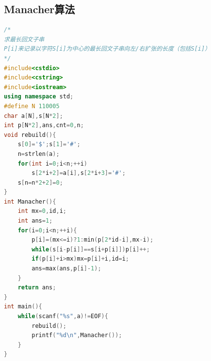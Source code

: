 \documentclass[UTF8,a4paper,titlepage]{ctexart}
\begin{document}
\subsection{Manacher算法}
\begin{lstlisting}[language=C++]
/*
求最长回文子串
P[i]来记录以字符S[i]为中心的最长回文子串向左/右扩张的长度（包括S[i]）
*/
#include<cstdio>
#include<cstring>
#include<iostream>
using namespace std;
#define N 110005 
char a[N],s[N*2];
int p[N*2],ans,cnt=0,n;
void rebuild(){
    s[0]='$';s[1]='#';
    n=strlen(a);
    for(int i=0;i<n;++i)
        s[2*i+2]=a[i],s[2*i+3]='#';
    s[n=n*2+2]=0;
}
int Manacher(){
    int mx=0,id,i;
    int ans=1; 
    for(i=0;i<n;++i){
        p[i]=(mx<=i)?1:min(p[2*id-i],mx-i);
        while(s[i-p[i]]==s[i+p[i]])p[i]++;
        if(p[i]+i>mx)mx=p[i]+i,id=i;
        ans=max(ans,p[i]-1);
    }
    return ans;
}
int main(){
    while(scanf("%s",a)!=EOF){
        rebuild();
        printf("%d\n",Manacher());
    }
}
	  \end{lstlisting}
\end{document}
